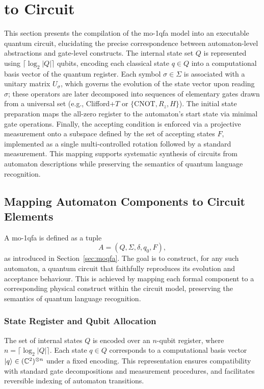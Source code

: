 \section{ to Circuit}
\label{sec:moqfa-to-circuit}

This section presents the compilation of the \gls{mo-1qfa} model into an executable quantum circuit, elucidating the precise correspondence between automaton-level abstractions and gate-level constructs. The internal state set $Q$ is represented using $\lceil\log_{2}|Q|\rceil$ qubits, encoding each classical state $q \in Q$ into a computational basis vector of the quantum register. Each symbol $\sigma \in \Sigma$ is associated with a unitary matrix $U_\sigma$, which governs the evolution of the state vector upon reading $\sigma$; these operators are later decomposed into sequences of elementary gates drawn from a universal set (e.g., Clifford+$T$ or $\{\mathrm{CNOT}, R_z, H\}$). The initial state preparation maps the all-zero register to the automaton's start state via minimal gate operations. Finally, the accepting condition is enforced via a projective measurement onto a subspace defined by the set of accepting states $F$, implemented as a single multi-controlled rotation followed by a standard measurement. This mapping supports systematic synthesis of circuits from automaton descriptions while preserving the semantics of quantum language recognition.

\subsection{Mapping Automaton Components to Circuit Elements}
A \gls{mo-1qfa} is defined as a tuple
\[
  A = (Q,\Sigma,\delta,q_0,F), 
\]
as introduced in Section~\ref{sec:moqfa}. The goal is to construct, for any such automaton, a quantum circuit that faithfully reproduces its evolution and acceptance behaviour. This is achieved by mapping each formal component to a corresponding physical construct within the circuit model, preserving the semantics of quantum language recognition.

\subsubsection*{State Register and Qubit Allocation}
The set of internal states $Q$ is encoded over an $n$-qubit register, where $n = \lceil\log_2 |Q|\rceil$. Each state $q \in Q$ corresponds to a computational basis vector $\ket{q} \in (\mathbb{C}^2)^{\otimes n}$ under a fixed encoding. This representation ensures compatibility with standard gate decompositions and measurement procedures, and facilitates reversible indexing of automaton transitions.

